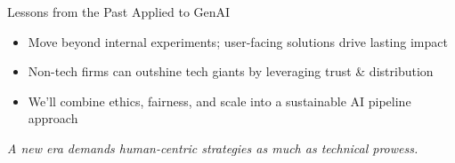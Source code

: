 \documentclass[aspectratio=169]{beamer}
\begin{document}
%
%
%
\begin{frame}{Lessons from the Past Applied to GenAI}
\begin{itemize}
\item Move beyond internal experiments; user-facing solutions drive lasting impact
\item Non-tech firms can outshine tech giants by leveraging trust \& distribution
\item We’ll combine ethics, fairness, and scale into a sustainable AI pipeline approach
\end{itemize}

\vspace{0.8em}
\emph{A new era demands human-centric strategies as much as technical prowess.}
\end{frame}
\end{document}
